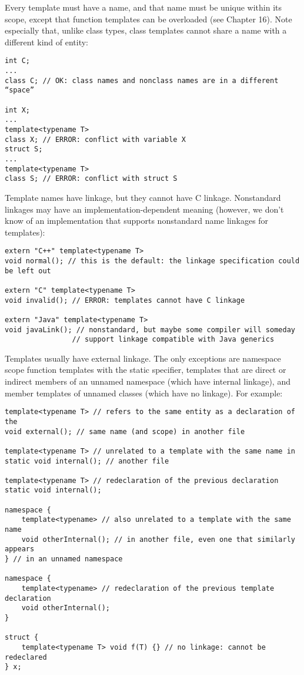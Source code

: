 Every template must have a name, and that name must be unique within its scope, except that function templates can be overloaded (see Chapter 16). Note especially that, unlike class types, class templates cannot share a name with a different kind of entity:

\begin{lstlisting}[style=styleCXX]
int C;
...
class C; // OK: class names and nonclass names are in a different “space”

int X;
...
template<typename T>
class X; // ERROR: conflict with variable X
struct S;
...
template<typename T>
class S; // ERROR: conflict with struct S
\end{lstlisting}

Template names have linkage, but they cannot have C linkage. Nonstandard linkages may have an implementation-dependent meaning (however, we don’t know of an implementation that supports nonstandard name linkages for templates):

\begin{lstlisting}[style=styleCXX]
extern "C++" template<typename T>
void normal(); // this is the default: the linkage specification could be left out

extern "C" template<typename T>
void invalid(); // ERROR: templates cannot have C linkage

extern "Java" template<typename T>
void javaLink(); // nonstandard, but maybe some compiler will someday
				// support linkage compatible with Java generics
\end{lstlisting}

Templates usually have external linkage. The only exceptions are namespace scope function templates with the static specifier, templates that are direct or indirect members of an unnamed namespace (which have internal linkage), and member templates of unnamed classes (which have no linkage). For example:

\begin{lstlisting}[style=styleCXX]
template<typename T> // refers to the same entity as a declaration of the
void external(); // same name (and scope) in another file

template<typename T> // unrelated to a template with the same name in
static void internal(); // another file

template<typename T> // redeclaration of the previous declaration
static void internal();

namespace {
	template<typename> // also unrelated to a template with the same name
	void otherInternal(); // in another file, even one that similarly appears
} // in an unnamed namespace

namespace {
	template<typename> // redeclaration of the previous template declaration
	void otherInternal();
}

struct {
	template<typename T> void f(T) {} // no linkage: cannot be redeclared
} x;
\end{lstlisting}

